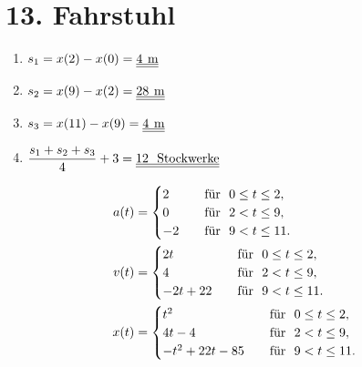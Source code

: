 \documentclass{alex_hü}
\begin{document}
\newpage
	\section*{13. Fahrstuhl}
		\begin{multicols}{2}
				\begin{enumerate}
					\item $ s_1 = x(2) - x(0) = \dl{4 \si{\m}} $\\
					\item $ s_2 = x(9) - x(2) = \dl{28 \si{\m}} $\\
					\item $ s_3 = x(11) - x(9) = \dl{4 \si{\m}} $\\[2ex]
					\item $ \dfrac{s_1 + s_2 + s_3}{4} + 3 = \underline{\underline{12\ \text{ Stockwerke}}} $
				\end{enumerate}
			\columnbreak
			\begin{align*}
			a(t) &= \begin{cases}
				2& \quad $für $\ 0 \le t \le 2, \\
				0& \quad $für $\ 2 < t \le 9, \\
				-2& \quad $für $\ 9 < t \le 11.
			\end{cases} \\
			v(t) &= \begin{cases}
				2t& \quad $für $\ 0 \le t \le 2, \\
				4& \quad $für $\ 2 < t \le 9, \\
				-2t + 22& \quad $für $\ 9 < t \le 11.
			\end{cases} \\
			x(t) &= \begin{cases}
				t^2& \quad $für $\ 0 \le t \le 2, \\
				4t - 4& \quad $für $\ 2 < t \le 9, \\
				-t^2 + 22t - 85& \quad $für $\ 9 < t \le 11.
			\end{cases} \\
			\end{align*}
		\end{multicols}
\end{document}
